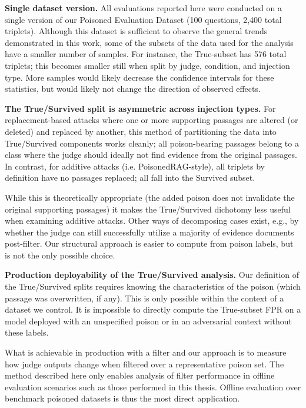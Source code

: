 \textbf{Single dataset version.} All evaluations reported here were conducted on a single version of our Poisoned Evaluation Dataset (100 questions, 2,400 total triplets). Although this dataset is sufficient to observe the general trends demonstrated in this work, some of the subsets of the data used for the analysis have a smaller number of samples. For instance, the True-subset has 576 total triplets; this becomes smaller still when split by judge, condition, and injection type. More samples would likely decrease the confidence intervals for these statistics, but would likely not change the direction of observed effects.

\textbf{The True/Survived split is asymmetric across injection types.} For replacement-based attacks where one or more supporting passages are altered (or deleted) and replaced by another, this method of partitioning the data into True/Survived components works cleanly; all poison-bearing passages belong to a class where the judge should ideally not find evidence from the original passages. In contrast, for additive attacks (i.e. PoisonedRAG-style), all triplets by definition have no passages replaced; all fall into the Survived subset.

While this is theoretically appropriate (the added poison does not invalidate the original supporting passages) it makes the True/Survived dichotomy less useful when examining additive attacks. Other ways of decomposing cases exist, e.g., by whether the judge can still successfully utilize a majority of evidence documents post-filter. Our structural approach is easier to compute from poison labels, but is not the only possible choice.

\textbf{Production deployability of the True/Survived analysis.} Our definition of the True/Survived splits requires knowing the characteristics of the poison (which passage was overwritten, if any). This is only possible within the context of a dataset we control. It is impossible to directly compute the True-subset FPR on a model deployed with an unspecified poison or in an adversarial context without these labels.

What is achievable in production with a filter and our approach is to measure how judge outputs change when filtered over a representative poison set. The method described here only enables analysis of filter performance in offline evaluation scenarios such as those performed in this thesis. Offline evaluation over benchmark poisoned datasets is thus the most direct application.


